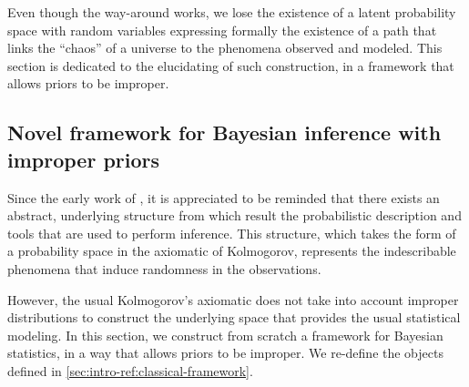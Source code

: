 Even though the way-around works, we lose the existence of a latent probability space with random variables expressing formally the existence of a path that links the ``chaos'' of a universe to the phenomena observed and modeled.
This section is dedicated to the elucidating of such construction, in a framework that allows priors to be improper.



\subsection{Novel framework for Bayesian inference with improper priors}\label{sec:intro-ref:novelframework}



Since the early work of \citet{kolmogorov_foundations_1933}, it is appreciated to be reminded that there exists an abstract, underlying structure from which result the probabilistic description and tools that are used to perform inference. This structure, which takes the form of a probability space in the axiomatic of Kolmogorov, represents the indescribable phenomena that induce randomness in the observations.

However, the usual Kolmogorov's axiomatic does not take  into account improper distributions to construct the underlying space that provides the usual statistical modeling. 
In this section, we
construct from scratch a framework for Bayesian statistics, in a way that allows priors to be improper.
We re-define the objects defined in \cref{sec:intro-ref:classical-framework}.





